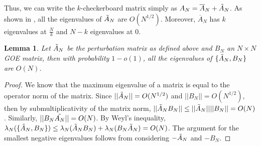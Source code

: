 \documentclass[11pt,reqno]{amsart}
\numberwithin{equation}{section}
\theoremstyle{plain}
\newtheorem{lemma}[thm]{Lemma}
\begin{document}

Thus, we can write the $k$-checkerboard matrix simply as $A_N=\overline{A}_N+\Tilde{A}_N$. As shown in \cite{split},  all the eigenvalues of $\Tilde{A}_N$ are $O(N^{1/2})$. Moreover, $\overline{A}_N$ has $k$ eigenvalues at $\frac{N}{k}$ and $N-k$ eigenvalues at $0$.

\begin{lemma} 
Let $\Tilde{A}_N$ be the perturbation matrix as defined above and $B_N$ an $N\times N$ GOE matrix, then with probability $1-o(1)$, all the eigenvalues of $\{\Tilde{A}_N, B_N\}$ are $O(N)$.
\end{lemma}

\begin{proof}

We know that the maximum eigenvalue of a matrix is equal to the operator norm of the matrix. Since $||\Tilde{A}_N||=O(N^{1/2})$ and $||B_N||=O(N^{1/2})$, then by submultiplicativity of the matrix norm, $||\Tilde{A}_NB_N||\leq ||\Tilde{A}_N||||B_N||=O(N)$. Similarly, $||B_N\Tilde{A_N}||=O(N)$. By Weyl's inequality, $\lambda_N(\{\Tilde{A}_N, B_N\})\leq \lambda_N(\Tilde{A}_NB_N)\\+\lambda_N(B_N\Tilde{A}_N)=O(N)$. The argument for the smallest negative eigenvalues follows from considering $-\Tilde{A}_N$ and $-B_N$.
\end{proof}
\end{document}
